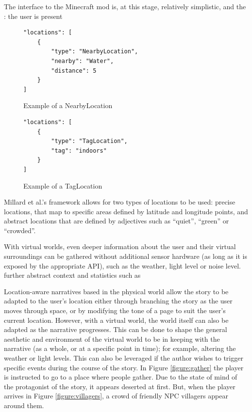 \documentclass{acm}
\begin{document}
The interface to the Minecraft mod is, at this stage, relatively simplistic, and the : the user is present

\begin{figure}
\centering
\begin{verbatim}
"locations": [
    {
        "type": "NearbyLocation",
        "nearby": "Water",
        "distance": 5
    }
]
\end{verbatim}

\caption{Example of a NearbyLocation}
\label{figure:nearbylocation}
\end{figure}

\begin{figure}
\centering
\begin{verbatim}
"locations": [
    {
        "type": "TagLocation",
        "tag": "indoors"
    }
]
\end{verbatim}

\caption{Example of a TagLocation}
\label{figure:nearbylocation}
\end{figure}


Millard et al.'s framework allows for two types of locations to be used: precise locations, that map to specific areas defined by latitude and longitude points, and abstract locations that are defined by adjectives such as ``quiet'', ``green'' or ``crowded''.

With virtual worlds, even deeper information about the user and their virtual surroundings can be gathered without additional sensor hardware (as long as it is exposed by the appropriate API), such as the weather, light level or noise level.
further abstract context and statistics such as


Location-aware narratives based in the physical world allow the story to be adapted to the user's location either through branching the story as the user moves through space, or by modifying the tone of a page to suit the user's current location. However, with a virtual world, the world itself can also be adapted as the narrative progresses. This can be done to shape the general aesthetic and environment of the virtual world to be in keeping with the narrative (as a whole, or at a specific point in time); for example, altering the weather or light levels.  This can also be leveraged if the author wishes to trigger specific events during the course of the story. In Figure \ref{figure:gather} the player is instructed to go to a place where people gather. Due to the state of mind of the protagonist of the story, it appears deserted at first. But, when the player arrives in Figure \ref{figure:villagers}, a crowd of friendly NPC villagers appear around them.
\end{document}

